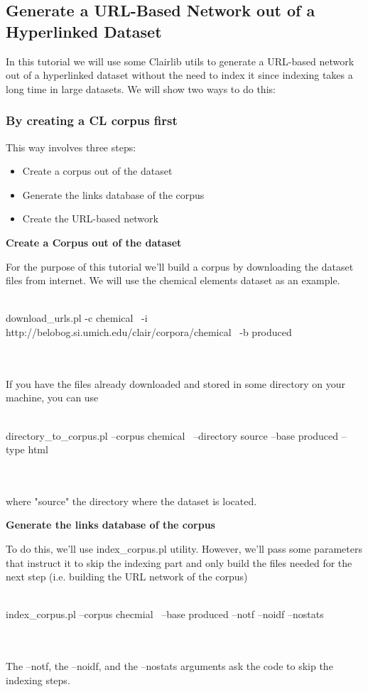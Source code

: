 \subsection{Generate a URL-Based Network out of a Hyperlinked Dataset}
In this tutorial we will use some Clairlib utils to generate a URL-based network out of a hyperlinked dataset without the need to index it since indexing takes a long time in large datasets. We will show two ways to do this:

\subsubsection{By creating a CL corpus first}

This way involves three steps:

\begin{itemize}
  \item  Create a corpus out of the dataset
  \item  Generate the links database of the corpus
  \item  Create the URL-based network
\end{itemize}

\textbf{Create a Corpus out of the dataset}

For the purpose of this tutorial we'll build a corpus by downloading the dataset files from internet. We will use the chemical elements dataset as an example.
\\
\\
\begin{boxedverbatim}
 download_urls.pl -c chemical \
 -i http://belobog.si.umich.edu/clair/corpora/chemical \
 -b produced
\end{boxedverbatim}
\\
\\
If you have the files already downloaded and stored in some directory on your machine, you can use
\\
\\
\begin{boxedverbatim}
 directory_to_corpus.pl --corpus chemical \
 --directory source --base produced --type html
\end{boxedverbatim}
\\
\\
where "source" the directory where the dataset is located.

\textbf{Generate the links database of the corpus}

To do this, we'll use index\_corpus.pl utility. However, we'll pass some parameters that instruct it to skip the indexing part and only build the files needed for the next step (i.e. building the URL network of the corpus)
\\
\\
\begin{boxedverbatim}
 index_corpus.pl --corpus checmial \
 --base produced --notf --noidf --nostats
\end{boxedverbatim}
\\
\\
The --notf, the --noidf, and the --nostats arguments ask the code to skip the indexing steps.


